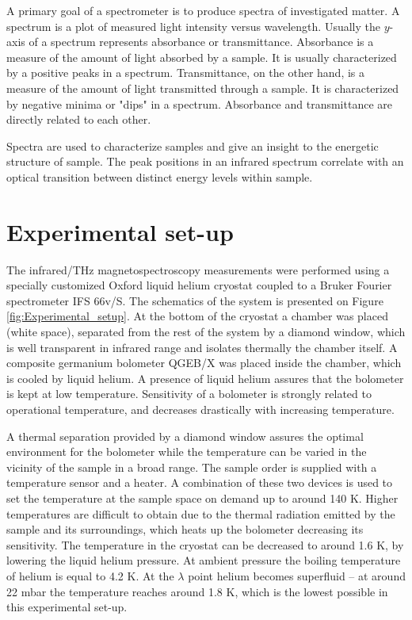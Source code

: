 \documentclass[titlepage,a4paper]{book}
\newcommand{\wciecie}{\quad\phantom{v}}
\begin{document}
A primary goal of a spectrometer is to produce spectra of investigated matter. A spectrum is a plot of measured light intensity versus wavelength. Usually the $y$-axis of a spectrum represents absorbance or transmittance. Absorbance is a measure of the amount of light absorbed by a sample. It is usually characterized by a positive peaks in a spectrum. Transmittance, on the other hand, is a measure of the amount of light transmitted through a sample. It is characterized by negative minima or "dips" in a spectrum. Absorbance and transmittance are directly related to each other.

Spectra are used to characterize samples and give an insight to the energetic structure of sample. The peak positions in an infrared spectrum correlate with an optical transition between distinct energy levels within sample. 


\clearpage
\section{Experimental set-up}
\wciecie
The infrared/THz magnetospectroscopy measurements were performed using a specially customized Oxford liquid helium cryostat coupled to a Bruker Fourier spectrometer IFS 66v/S. The schematics of the system is presented on Figure \ref{fig:Experimental_setup}. At the bottom of the cryostat a chamber was placed (white space), separated from the rest of the system by a diamond window, which is well transparent in infrared range and isolates thermally the chamber itself. A composite germanium bolometer QGEB/X was placed inside the chamber, which is cooled by liquid helium. A presence of liquid helium assures that the bolometer is kept at low temperature. Sensitivity of a bolometer is strongly related to operational temperature, and decreases drastically with increasing temperature. 

A thermal separation provided by a diamond window assures the optimal environment for the bolometer while the temperature can be varied in the vicinity of the sample in a broad range. The sample order is supplied with a temperature sensor and a heater. A combination of these two devices is used to set the temperature at the sample space on demand up to around 140 K. Higher temperatures are difficult to obtain due to the thermal radiation emitted by the sample and its surroundings, which heats up the bolometer decreasing its sensitivity. The temperature in the cryostat can be decreased to around 1.6 K, by lowering the liquid helium pressure. At ambient pressure the boiling temperature of helium is equal to 4.2 K. At the $\lambda$ point helium becomes superfluid -- at around 22 mbar the temperature reaches around 1.8 K, which is the lowest possible in this experimental set-up.
\end{document}

